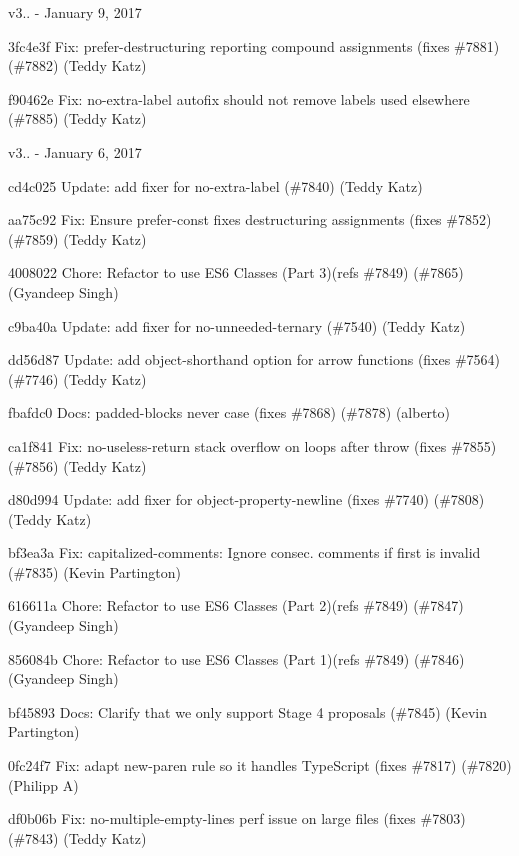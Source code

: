 v3.. -\/ January 9, 2017


\begin{DoxyItemize}
\item 3fc4e3f Fix\+: prefer-\/destructuring reporting compound assignments (fixes \#7881) (\#7882) (Teddy Katz)
\item f90462e Fix\+: no-\/extra-\/label autofix should not remove labels used elsewhere (\#7885) (Teddy Katz)
\end{DoxyItemize}

v3.. -\/ January 6, 2017


\begin{DoxyItemize}
\item cd4c025 Update\+: add fixer for no-\/extra-\/label (\#7840) (Teddy Katz)
\item aa75c92 Fix\+: Ensure prefer-\/const fixes destructuring assignments (fixes \#7852) (\#7859) (Teddy Katz)
\item 4008022 Chore\+: Refactor to use E\+S6 Classes (Part 3)(refs \#7849) (\#7865) (Gyandeep Singh)
\item c9ba40a Update\+: add fixer for {\ttfamily no-\/unneeded-\/ternary} (\#7540) (Teddy Katz)
\item dd56d87 Update\+: add object-\/shorthand option for arrow functions (fixes \#7564) (\#7746) (Teddy Katz)
\item fbafdc0 Docs\+: {\ttfamily padded-\/blocks} {\ttfamily never} case (fixes \#7868) (\#7878) (alberto)
\item ca1f841 Fix\+: no-\/useless-\/return stack overflow on loops after throw (fixes \#7855) (\#7856) (Teddy Katz)
\item d80d994 Update\+: add fixer for object-\/property-\/newline (fixes \#7740) (\#7808) (Teddy Katz)
\item bf3ea3a Fix\+: capitalized-\/comments\+: Ignore consec. comments if first is invalid (\#7835) (Kevin Partington)
\item 616611a Chore\+: Refactor to use E\+S6 Classes (Part 2)(refs \#7849) (\#7847) (Gyandeep Singh)
\item 856084b Chore\+: Refactor to use E\+S6 Classes (Part 1)(refs \#7849) (\#7846) (Gyandeep Singh)
\item bf45893 Docs\+: Clarify that we only support Stage 4 proposals (\#7845) (Kevin Partington)
\item 0fc24f7 Fix\+: adapt new-\/paren rule so it handles Type\+Script (fixes \#7817) (\#7820) (Philipp A)
\item df0b06b Fix\+: no-\/multiple-\/empty-\/lines perf issue on large files (fixes \#7803) (\#7843) (Teddy Katz)

\end{DoxyItemize}
